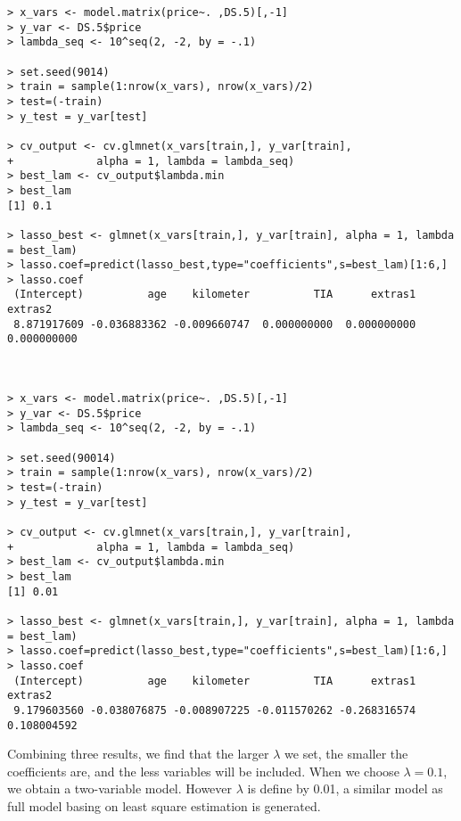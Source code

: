 \documentclass[a4paper]{article}
\begin{document}
\begin{verbatim}
> x_vars <- model.matrix(price~. ,DS.5)[,-1]
> y_var <- DS.5$price
> lambda_seq <- 10^seq(2, -2, by = -.1)

> set.seed(9014)
> train = sample(1:nrow(x_vars), nrow(x_vars)/2)
> test=(-train)
> y_test = y_var[test]

> cv_output <- cv.glmnet(x_vars[train,], y_var[train], 
+             alpha = 1, lambda = lambda_seq)
> best_lam <- cv_output$lambda.min
> best_lam
[1] 0.1

> lasso_best <- glmnet(x_vars[train,], y_var[train], alpha = 1, lambda = best_lam)
> lasso.coef=predict(lasso_best,type="coefficients",s=best_lam)[1:6,]
> lasso.coef
 (Intercept)          age    kilometer          TIA      extras1      extras2 
 8.871917609 -0.036883362 -0.009660747  0.000000000  0.000000000  0.000000000 



> x_vars <- model.matrix(price~. ,DS.5)[,-1]
> y_var <- DS.5$price
> lambda_seq <- 10^seq(2, -2, by = -.1)

> set.seed(90014)
> train = sample(1:nrow(x_vars), nrow(x_vars)/2)
> test=(-train)
> y_test = y_var[test]

> cv_output <- cv.glmnet(x_vars[train,], y_var[train], 
+             alpha = 1, lambda = lambda_seq)
> best_lam <- cv_output$lambda.min
> best_lam
[1] 0.01

> lasso_best <- glmnet(x_vars[train,], y_var[train], alpha = 1, lambda = best_lam)
> lasso.coef=predict(lasso_best,type="coefficients",s=best_lam)[1:6,]
> lasso.coef
 (Intercept)          age    kilometer          TIA      extras1      extras2 
 9.179603560 -0.038076875 -0.008907225 -0.011570262 -0.268316574  0.108004592 

\end{verbatim}
Combining three results, we find that the larger $\lambda$ we set, the smaller the coefficients are, and the less variables will be included. When we choose $\lambda = 0.1$, we obtain a two-variable model. However $\lambda$ is define by 0.01, a similar model as full model basing on least square estimation is generated.









\end{document}
